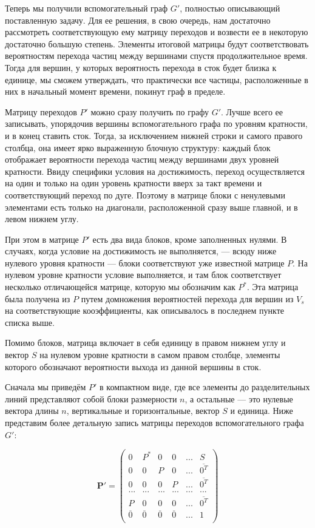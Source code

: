 Теперь мы получили вспомогательный граф $G'$, полностью описывающий поставленную задачу. Для ее решения, в свою очередь, нам достаточно рассмотреть соответствующую ему матрицу переходов и возвести ее в некоторую достаточно большую степень. Элементы итоговой матрицы будут соответствовать вероятностям перехода частиц между вершинами спустя продолжительное время. Тогда для вершин, у которых вероятность перехода в сток будет близка к единице, мы сможем утверждать, что практически все частицы, расположенные в них в начальный момент времени, покинут граф в пределе. 

Матрицу переходов $P'$ можно сразу получить по графу $G'$. Лучше всего ее записывать, упорядочив вершины вспомогательного графа по уровням кратности, и в конец ставить сток. Тогда, за исключением нижней строки и самого правого столбца, она имеет ярко выраженную блочную структуру: каждый блок отображает вероятности перехода частиц между вершинами двух уровней кратности. Ввиду специфики условия на достижимость, переход осуществляется на один и только на один уровень кратности вверх за такт времени и соответствующий переход по дуге. Поэтому в матрице блоки с ненулевыми элементами есть только на диагонали, расположенной сразу выше главной, и в левом нижнем углу. 

При этом в матрице $P'$ есть два вида блоков, кроме заполненных нулями. В случаях, когда условие на достижимость не выполняется, --- всюду ниже нулевого уровня кратности --- блоки соответствуют уже известной матрице $P$. На нулевом уровне кратности условие выполняется, и там блок соответствует несколько отличающейся матрице, которую мы обозначим как $P^*$. Эта матрица была получена из $P$ путем домножения вероятностей перехода для вершин из $V_s$ на соответствующие кооэффициенты, как описывалось в последнем пункте списка выше.

Помимо блоков, матрица включает в себя единицу в правом нижнем углу и вектор $S$ на нулевом уровне кратности в самом правом столбце, элементы которого обозначают вероятности выхода из данной вершины в сток.	

Сначала мы приведём $P'$ в компактном виде, где все элементы до разделительных линий представляют собой блоки размерности $n$, а остальные --- это нулевые вектора длины $n$, вертикальные и горизонтальные, вектор $S$ и единица. Ниже представим более детальную запись матрицы переходов вспомогательного графа $G'$:

\begin{displaymath}
\mathbf{P'} =
\left( \begin{array}{ccccc|c}
0 & P^* & 0 & 0 & ... & S \\
0 & 0 & P & 0 & ... & \overline {0^T} \\
0 & 0 & 0 & P & ... & \overline {0^T} \\
... & ... & ... & ... & ... & ... \\
P & 0 & 0 & 0 & ... & \overline {0^T} \\
\hline
\overline 0 &  \overline 0 &  \overline 0 &  \overline 0 & ... & 1 \\
\end{array} \right)
\end{displaymath}

